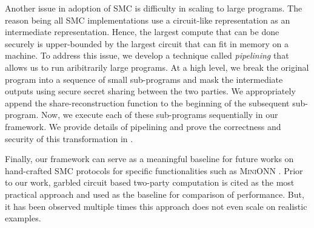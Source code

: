 Another issue in adoption of SMC is difficulty in scaling to large programs. 
The reason being all SMC implementations use a circuit-like representation as an intermediate representation. Hence, the largest compute that can be done securely is upper-bounded by the largest circuit that can fit in memory on a machine. 
To address this issue, we develop a technique called \emph{pipelining} that allows us to run aribitrarily large programs. At a high level, we break the original program into a sequence of small sub-programs and mask the intermediate outputs using secure secret sharing between the two parties. We appropriately append the share-reconstruction function to the beginning of the subsequent sub-program. Now, we execute each of these sub-programs sequentially in our framework. We provide details of pipelining and prove the correctness and security of this transformation in .

Finally, our framework \tool can serve as a meaningful baseline for future works on hand-crafted SMC protocols for specific functionalities such as \textsc{MiniONN} \cite{minionn}. 
Prior to our work, garbled circuit based two-party computation is cited as the most practical approach and used as the baseline for comparison of performance. But, it has been observed multiple times this approach does not even scale on realistic examples.



